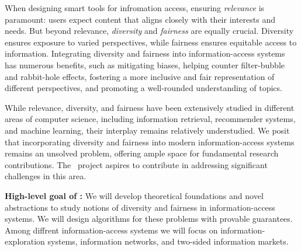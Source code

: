 \documentclass[a4paper,11pt]{article}
\begin{document}

When designing smart tools for infromation access, ensuring \emph{relevance} is paramount:
users expect content that aligns closely with their interests and needs.
But beyond relevance, \emph{diversity} and \emph{fairness} are equally crucial.
Diversity ensures exposure to varied perspectives, 
while fairness ensures equitable access to information.
Integrating diversity and fairness into information-access systems has numerous benefits, 
such as mitigating biases, 
helping counter filter-bubble and rabbit-hole effects, 
fostering a more inclusive and fair representation of different perspectives, and 
promoting a well-rounded understanding of topics.

While relevance, diversity, and fairness
have been extensively studied in different areas of computer science, 
including information retrieval, recommender systems, and machine learning,
their interplay remains relatively understudied.
We posit that incorporating diversity and fairness into modern information-access systems
remains an unsolved problem, 
offering ample space for fundamental research contributions.
The \acronym\ project aspires to contribute in addressing 
significant challenges in this area. 

\medskip
\noindent
\hspace{-3mm}\colorbox{verylightmagenta}{
\begin{minipage}{\textwidth}
{\bf High-level goal of \acronym:} 
We will develop theoretical foundations and novel abstractions to 
study notions of diversity and fairness in information-access systems.
We will design algorithms for these problems with provable guarantees.
Among diffrent information-access systems we will focus on 
information-exploration systems, information networks, and two-sided information markets.
\end{minipage}}

{\color{red}}
\end{document}
